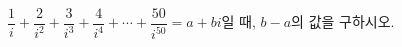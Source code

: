 $\dfrac{1}{i}+\dfrac{2}{i^2}+\dfrac{3}{i^3}+\dfrac{4}{i^4}+\cdots+\dfrac{50}{i^{50}}=a+bi$일 때, $b-a$의 값을 구하시오. 
